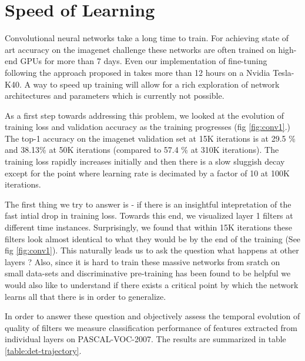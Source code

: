 \documentclass[runningheads]{llncs}
\begin{document}
\section{Speed of Learning}
Convolutional neural networks take a long time to train. For achieving state of art accuracy on the imagenet challenge these networks are often trained on high-end GPUs for more than 7 days. Even our implementation of fine-tuning following the approach proposed in \cite{rcnn} takes more than 12 hours on a Nvidia Tesla-K40. A way to speed up training will allow for a rich exploration of network architectures and parameters which is currently not possible.    

As a first step towards addressing this problem, we looked at the evolution of training loss and validation accuracy as the training progresses (fig \ref{fig:conv1}.) The top-1 accuracy on the imagenet validation set at 15K iterations is at 29.5 \% and 38.13\% at 50K iterations (compared to 57.4 \% at 310K iterations). The training loss rapidly increases initially and then there is a slow sluggish decay except for the point where learning rate is decimated by a factor of 10 at 100K iterations.

The first thing we try to answer is - if there is an insightful intepretation of the fast intial drop in training loss. Towards this end, we visualized layer 1 filters at different time instances. Surprisingly, we found that within 15K iterations these filters look almost identical to what they would be by the end of the training (See fig \ref{fig:conv1}). This naturally leads us to ask the question what happens at other layers ? Also, since it is hard to train these massive networks from sratch on small data-sets and discriminative pre-training has been found to be helpful we would also like to understand if there exists a critical point by which the network learns all that there is in order to generalize.  

In order to answer these question and objectively assess the temporal evolution of quality of filters we measure classification performance of features extracted from individual layers on PASCAL-VOC-2007.  The results are summarized in table \ref{table:det-trajectory}. 
\end{document}
